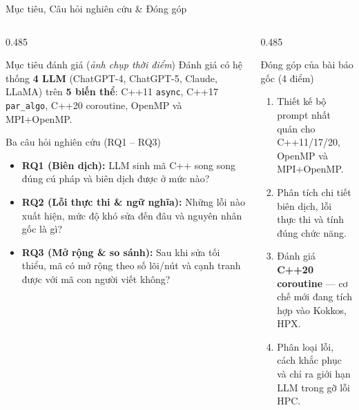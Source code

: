\documentclass[aspectratio=169,10pt]{beamer}
\newcommand{\code}[1]{\texttt{\color{BlueDark}#1}}
\begin{document}
\begin{frame}{Mục tiêu, Câu hỏi nghiên cứu \& Đóng góp}
\begin{columns}[T,totalwidth=\textwidth]
  \begin{column}{0.485\textwidth}
    \begin{bluebox}[height=1.74cm,top=3pt,bottom=3pt]{Mục tiêu đánh giá (\emph{ảnh chụp thời điểm})}
      \scriptsize Đánh giá có hệ thống \textbf{4 LLM} (ChatGPT-4, ChatGPT-5, Claude, LLaMA) trên \textbf{5 biến thể}: C++11 \code{async}, C++17 \code{par\_algo}, C++20 coroutine, OpenMP và MPI+OpenMP.
    \end{bluebox}
    \vspace{0.20cm}
    \begin{hboxcard}[height=4.20cm,top=4pt,bottom=4pt]{Ba câu hỏi nghiên cứu (RQ1 -- RQ3)}
      \begin{itemize}\scriptsize\setlength{\itemsep}{5pt}
        \item \textbf{RQ1 (Biên dịch):} LLM sinh mã C++ song song đúng cú pháp và biên dịch được ở mức nào?
        \item \textbf{RQ2 (Lỗi thực thi \& ngữ nghĩa):} Những lỗi nào xuất hiện, mức độ khó sửa đến đâu và nguyên nhân gốc là gì?
        \item \textbf{RQ3 (Mở rộng \& so sánh):} Sau khi sửa tối thiểu, mã có mở rộng theo số lõi/nút và cạnh tranh được với mã con người viết không?
      \end{itemize}
    \end{hboxcard}
  \end{column}
  \begin{column}{0.485\textwidth}
    \begin{bluebox}[height=3.34cm,top=3pt,bottom=3pt]{Đóng góp của bài báo gốc (4 điểm)}
      \begin{enumerate}\scriptsize\setlength{\itemsep}{1.8pt}
        \item Thiết kế bộ prompt nhất quán cho C++11/17/20, OpenMP và MPI+OpenMP.
        \item Phân tích chi tiết biên dịch, lỗi thực thi và tính đúng chức năng.
        \item Đánh giá \textbf{C++20 coroutine} --- cơ chế mới đang tích hợp vào Kokkos, HPX.
        \item Phân loại lỗi, cách khắc phục và chỉ ra giới hạn LLM trong gỡ lỗi HPC.
      \end{enumerate}
    \end{bluebox}
    \vspace{0.20cm}

\end{column}
\end{columns}
\end{frame}
\end{document}
